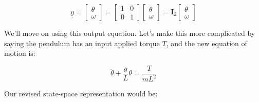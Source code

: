 \documentclass[
  letterpaper,
  DIV=11,
  numbers=noendperiod]{scrreprt}
\begin{document}
\[\underline{y} = \begin{bmatrix}
    \theta \\
    \omega  \end{bmatrix} = \begin{bmatrix}
        1 & 0\\
        0 & 1
    \end{bmatrix} \begin{bmatrix}
        \theta \\
        \omega  \end{bmatrix} = \textbf{I}_2 \begin{bmatrix}
            \theta \\
            \omega  \end{bmatrix}\]

We'll move on using this output equation. Let's make this more
complicated by saying the pendulum has an input applied torque \(T\),
and the new equation of motion is:

\[\ddot{\theta} + \frac{g}{L} \theta = \frac{T}{mL^2}\]

Our revised state-space representation would be:
\end{document}
